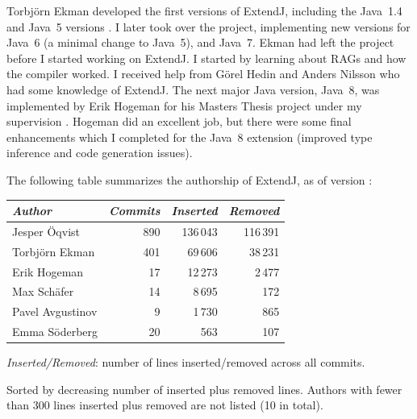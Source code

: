 \documentclass[10pt, twoside, openright]{book}
\begin{document}
Torbj{\"o}rn Ekman developed the first versions of ExtendJ, including the Java~1.4 and Java~5
versions \cite{DBLP:conf/ecoop/EkmanH04,jastaddj}.
I later took over the project, implementing new versions for Java~6 (a minimal change to
Java~5), and Java~7.  Ekman had left the project before I started working on ExtendJ. I started by
learning about RAGs and how the compiler worked. I received help from G{\"o}rel Hedin and Anders Nilsson
who had some knowledge of ExtendJ.
The next major Java version, Java~8, was implemented by Erik Hogeman for his Masters Thesis project
under my supervision \cite{Hogeman2014}.  Hogeman did an excellent job, but there were some
final enhancements
which I completed for the Java~8 extension (improved type inference and code generation issues).

The following table summarizes the authorship of ExtendJ, as of version \extendjversion:

\begin{center}
\begin{threeparttable}
\begin{tabular}{lrrr}
  \toprule
  \emph{Author} & \emph{Commits} & \emph{Inserted} & \emph{Removed} \\
  \midrule
  Jesper Öqvist & 890 & 136\,043 & 116\,391 \\
  Torbjörn Ekman & 401 & 69\,606 & 38\,231 \\
  Erik Hogeman & 17 & 12\,273 & 2\,477 \\
  Max Schäfer & 14 & 8\,695 & 172 \\
  Pavel Avgustinov & 9 & 1\,730 & 865 \\
  Emma Söderberg & 20 & 563 & 107 \\
  \bottomrule
\end{tabular}
\begin{tablenotes}
\small
\item \emph{Inserted/Removed}: number of lines inserted/removed across all commits.\footnotemark{}
\item Sorted by decreasing number of inserted plus removed lines.
Authors with fewer than 300 lines inserted plus removed are not listed (10 in total).
\end{tablenotes}
\end{threeparttable}
\end{center}
\end{document}
